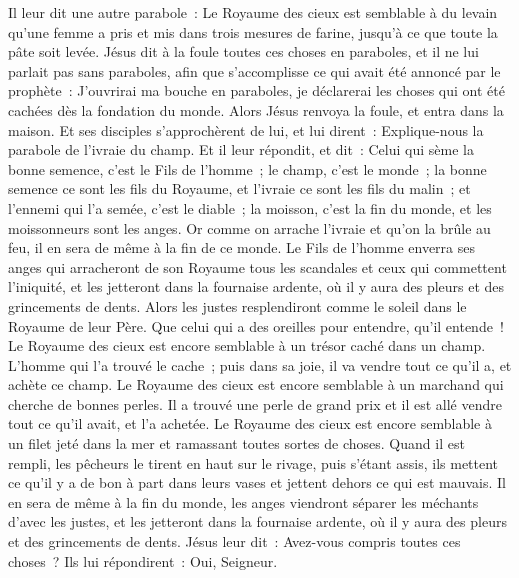 \begin{multicols}{2}
Il leur dit une autre parabole~: Le Royaume des cieux est semblable à du levain qu'une femme a pris et mis dans trois mesures de farine, jusqu'à ce que toute la pâte soit levée.
Jésus dit à la foule toutes ces choses en paraboles, et il ne lui parlait pas sans paraboles,
afin que s'accomplisse ce qui avait été annoncé par le prophète~: J'ouvrirai ma bouche en paraboles, je déclarerai les choses qui ont été cachées dès la fondation du monde.
Alors Jésus renvoya la foule, et entra dans la maison. Et ses disciples s'approchèrent de lui, et lui dirent~: Explique-nous la parabole de l'ivraie du champ.
Et il leur répondit, et dit~: Celui qui sème la bonne semence, c'est le Fils de l'homme~;
le champ, c'est le monde~; la bonne semence ce sont les fils du Royaume, et l'ivraie ce sont les fils du malin~;
et l'ennemi qui l'a semée, c'est le diable~; la moisson, c'est la fin du monde, et les moissonneurs sont les anges.
Or comme on arrache l'ivraie et qu'on la brûle au feu, il en sera de même à la fin de ce monde.
Le Fils de l'homme enverra ses anges qui arracheront de son Royaume tous les scandales et ceux qui commettent l'iniquité,
et les jetteront dans la fournaise ardente, où il y aura des pleurs et des grincements de dents.
Alors les justes resplendiront comme le soleil dans le Royaume de leur Père. Que celui qui a des oreilles pour entendre, qu'il entende~!
Le Royaume des cieux est encore semblable à un trésor caché dans un champ. L'homme qui l'a trouvé le cache~; puis dans sa joie, il va vendre tout ce qu'il a, et achète ce champ.
Le Royaume des cieux est encore semblable à un marchand qui cherche de bonnes perles.
Il a trouvé une perle de grand prix et il est allé vendre tout ce qu'il avait, et l'a achetée.
Le Royaume des cieux est encore semblable à un filet jeté dans la mer et ramassant toutes sortes de choses.
Quand il est rempli, les pêcheurs le tirent en haut sur le rivage, puis s'étant assis, ils mettent ce qu'il y a de bon à part dans leurs vases et jettent dehors ce qui est mauvais.
Il en sera de même à la fin du monde, les anges viendront séparer les méchants d'avec les justes,
et les jetteront dans la fournaise ardente, où il y aura des pleurs et des grincements de dents.
Jésus leur dit~: Avez-vous compris toutes ces choses~? Ils lui répondirent~: Oui, Seigneur.

\end{multicols}
